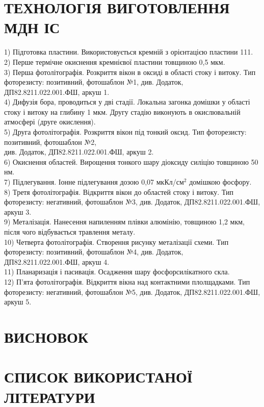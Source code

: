 \documentclass[a4paper,14pt]{extreport}
\begin{document}
\chapter{ТЕХНОЛОГІЯ ВИГОТОВЛЕННЯ МДН ІС}
	1) Підготовка пластини. Використовується кремній з орієнтацією пластини 111.\\
	2) Перше термічне окиснення кремнієвої пластини товщиною 0,5 мкм. \\
	3) Перша фотолітографія. Розкриття вікон в оксиді в області стоку і витоку. Тип фоторезисту: позитивний, фотошаблон №1, див. Додаток, ДП82.8211.022.001.ФШ, аркуш 1.\\
	4) Дифузія бора, проводиться у дві стадії. Локальна загонка домішки у області стоку і витоку на глибину 1 мкм. Другу стадію виконують в окислювальній атмосфері (друге окислення).\\
	5) Друга фотолітографія. Розкриття вікон під тонкий оксид. Тип фоторезисту: позитивний, фотошаблон №2, \\див. Додаток, ДП82.8211.022.001.ФШ, аркуш 2.\\
	6) Окиснення областей. Вирощення тонкого шару діоксиду силіцію товщиною 50 нм.\\
	7) Підлегування. Іонне підлегування дозою 0,07 мкКл/см$^2$ домішкою фосфору.\\
	8) Третя фотолітографія. Відкриття вікон до областей стоку і витоку. Тип фоторезисту: негативний, фотошаблон №3, див. Додаток, ДП82.8211.022.001.ФШ, аркуш 3.\\
	9) Металізація. Нанесення напиленням плівки алюмінію, товщиною 1,2 мкм, після чого відбувається травлення металу.\\
	10) Четверта фотолітографія. Створення рисунку металізації схеми. Тип фоторезисту: позитивний, фотошаблон №4, див. Додаток, ДП82.8211.022.001.ФШ, аркуш 4.\\
	11) Планаризація і пасивація. Осадження шару фосфорсилікатного скла.\\
	12) П’ята фотолітографія. Відкриття вікна над контактними плолщадками. Тип фоторезисту: негативний, фотошаблон №5, див. Додаток, ДП82.8211.022.001.ФШ, аркуш 5.

\newpage
\chapter{ВИСНОВОК}

\newpage
\chapter{СПИСОК ВИКОРИСТАНОЇ ЛІТЕРАТУРИ }
\end{document}
